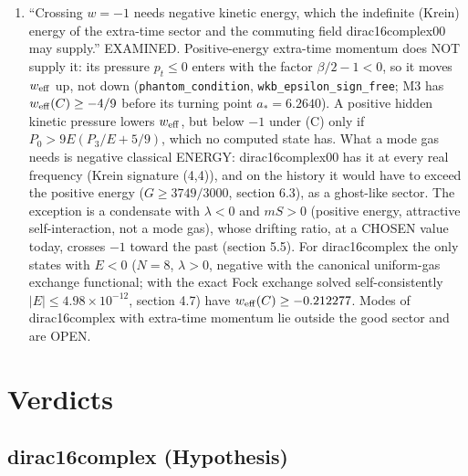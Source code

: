 \documentclass[11pt]{article}
\begin{document}
\begin{enumerate}
\item ``Crossing $w = -1$ needs negative kinetic energy, which the indefinite (Krein) energy of the extra-time sector and the commuting field dirac16complex00 may supply.'' EXAMINED. Positive-energy extra-time momentum does NOT supply it: its pressure $p_t \leq 0$ enters with the factor $\beta/2 - 1 < 0$, so it moves $w_{\rm eff}$ up, not down (\texttt{phantom\_\allowbreak{}conditio\allowbreak{}n}, \texttt{wkb\_epsi\allowbreak{}lon\_sign\allowbreak{}\_free}; M3 has $w_{\rm eff}(C) \geq -4/9$ before its turning point $a_* = 6.2640$). A positive hidden kinetic pressure lowers $w_{\rm eff}$, but below $-1$ under (C) only if $P_0 > 9E(P_3/E + 5/9)$, which no computed state has. What a mode gas needs is negative classical ENERGY: dirac16complex00 has it at every real frequency (Krein signature (4,4)), and on the history it would have to exceed the positive energy ($G \geq 3749/3000$, section 6.3), as a ghost-like sector. The exception is a condensate with $\lambda < 0$ and $mS > 0$ (positive energy, attractive self-interaction, not a mode gas), whose drifting ratio, at a CHOSEN value today, crosses $-1$ toward the past (section 5.5). For dirac16complex the only states with $E < 0$ ($N = 8$, $\lambda > 0$, negative with the canonical uniform-gas exchange functional; with the exact Fock exchange solved self-consistently $\lvert E\rvert \leq 4.98 \times 10^{-12}$, section 4.7) have $w_{\rm eff}(C) \geq -0.212277$. Modes of dirac16complex with extra-time momentum lie outside the good sector and are OPEN.
\end{enumerate}

\section{Verdicts}

\subsection{dirac16complex (Hypothesis)}
\end{document}
